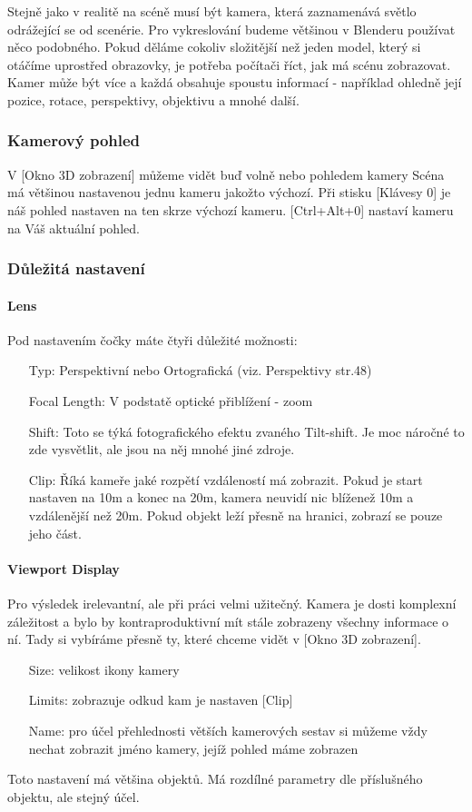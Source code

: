 \documentclass[12pt,a4paper]{report}
\begin{document}
	Stejně jako v realitě na scéně musí být kamera, která zaznamenává
	světlo odrážející se od scenérie. Pro vykreslování budeme většinou
	v Blenderu používat něco podobného. Pokud děláme cokoliv složitější než
	jeden model, který si otáčíme uprostřed obrazovky, je potřeba počítači
	říct, jak má scénu zobrazovat. Kamer může být více a každá obsahuje
	spoustu informací - například ohledně její pozice, rotace, perspektivy,
	objektivu a mnohé další.
	
	\subsubsection{Kamerový pohled}
	V [Okno 3D zobrazení] můžeme vidět buď volně nebo pohledem kamery
	Scéna má většinou nastavenou jednu kameru jakožto výchozí. Při stisku
	[Klávesy 0] je náš pohled nastaven na ten skrze výchozí kameru.
	[Ctrl+Alt+0] nastaví kameru na Váš aktuální pohled.
	\subsubsection{Důležitá nastavení}
	\paragraph{Lens}
	Pod nastavením čočky máte čtyři důležité možnosti:
	\begin{itemize}
	\item[Typ:] Perspektivní nebo Ortografická (viz. Perspektivy str.48)
	\item[Focal Length:] V podstatě optické přiblížení - zoom
	\item[Shift:] Toto se týká fotografického efektu zvaného Tilt-shift. Je moc
	náročné to zde vysvětlit, ale jsou na něj mnohé jiné zdroje.
	\item[Clip:] Říká kameře jaké rozpětí vzdáleností má zobrazit. Pokud je
	start nastaven na 10m a konec na 20m, kamera neuvidí nic blíženež 10m a vzdálenější než 20m. Pokud objekt leží přesně na
	hranici, zobrazí se pouze jeho část.
	\end{itemize}

	\paragraph{Viewport Display}
	Pro výsledek irelevantní, ale při práci velmi užitečný. Kamera je dosti
	komplexní záležitost a bylo by kontraproduktivní mít stále zobrazeny
	všechny informace o ní. Tady si vybíráme přesně ty, které chceme vidět
	v [Okno 3D zobrazení].
	\begin{itemize}
	\item[Size:] velikost ikony kamery
	\item[Limits:] zobrazuje odkud kam je nastaven [Clip]
	\item[Name:] pro účel přehlednosti větších kamerových sestav si můžeme
	vždy nechat zobrazit jméno kamery, jejíž pohled máme zobrazen
	\end{itemize}
	Toto nastavení má většina objektů. Má rozdílné parametry dle příslušného
	objektu, ale stejný účel.
	
\end{document}
